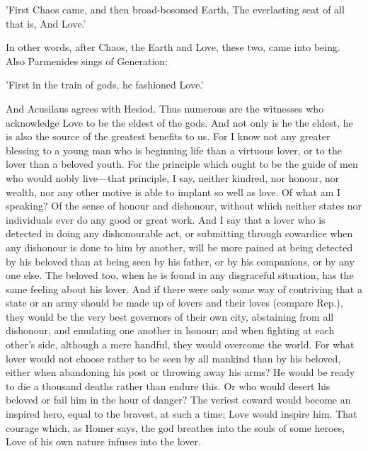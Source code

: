 \documentclass[11pt,letter]{article}
\begin{document}
\par  'First Chaos came, and then broad-bosomed Earth, The everlasting seat of all that is, And Love.'

\par  In other words, after Chaos, the Earth and Love, these two, came into being. Also Parmenides sings of Generation:

\par  'First in the train of gods, he fashioned Love.'

\par  And Acusilaus agrees with Hesiod. Thus numerous are the witnesses who acknowledge Love to be the eldest of the gods. And not only is he the eldest, he is also the source of the greatest benefits to us. For I know not any greater blessing to a young man who is beginning life than a virtuous lover, or to the lover than a beloved youth. For the principle which ought to be the guide of men who would nobly live—that principle, I say, neither kindred, nor honour, nor wealth, nor any other motive is able to implant so well as love. Of what am I speaking? Of the sense of honour and dishonour, without which neither states nor individuals ever do any good or great work. And I say that a lover who is detected in doing any dishonourable act, or submitting through cowardice when any dishonour is done to him by another, will be more pained at being detected by his beloved than at being seen by his father, or by his companions, or by any one else. The beloved too, when he is found in any disgraceful situation, has the same feeling about his lover. And if there were only some way of contriving that a state or an army should be made up of lovers and their loves (compare Rep.), they would be the very best governors of their own city, abstaining from all dishonour, and emulating one another in honour; and when fighting at each other's side, although a mere handful, they would overcome the world. For what lover would not choose rather to be seen by all mankind than by his beloved, either when abandoning his post or throwing away his arms? He would be ready to die a thousand deaths rather than endure this. Or who would desert his beloved or fail him in the hour of danger? The veriest coward would become an inspired hero, equal to the bravest, at such a time; Love would inspire him. That courage which, as Homer says, the god breathes into the souls of some heroes, Love of his own nature infuses into the lover.
\end{document}

